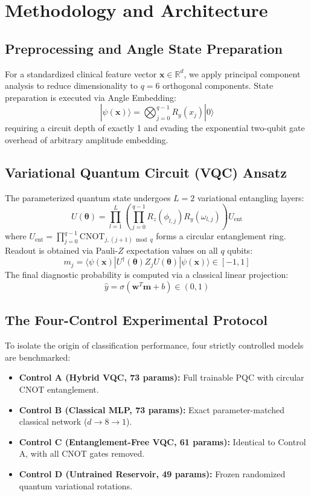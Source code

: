 \documentclass[conference]{IEEEtran}
\begin{document}
\section{Methodology and Architecture}

\subsection{Preprocessing and Angle State Preparation}
For a standardized clinical feature vector $\mathbf{x} \in \mathbb{R}^d$, we apply principal component analysis to reduce dimensionality to $q = 6$ orthogonal components. State preparation is executed via Angle Embedding:
\begin{equation}
|\psi(\mathbf{x})\rangle = \bigotimes_{j=0}^{q-1} R_y(x_j) |0\rangle
\end{equation}
requiring a circuit depth of exactly 1 and evading the exponential two-qubit gate overhead of arbitrary amplitude embedding.

\subsection{Variational Quantum Circuit (VQC) Ansatz}
The parameterized quantum state undergoes $L = 2$ variational entangling layers:
\begin{equation}
U(\boldsymbol{\theta}) = \prod_{l=1}^{L} \left( \prod_{j=0}^{q-1} R_z(\phi_{l,j}) R_y(\omega_{l,j}) \right) U_{\text{ent}}
\end{equation}
where $U_{\text{ent}} = \prod_{j=0}^{q-1} \text{CNOT}_{j, (j+1) \bmod q}$ forms a circular entanglement ring. Readout is obtained via Pauli-$Z$ expectation values on all $q$ qubits:
\begin{equation}
m_j = \langle \psi(\mathbf{x}) | U^\dagger(\boldsymbol{\theta}) Z_j U(\boldsymbol{\theta}) | \psi(\mathbf{x}) \rangle \in [-1, 1]
\end{equation}
The final diagnostic probability is computed via a classical linear projection:
\begin{equation}
\hat{y} = \sigma(\mathbf{w}^T \mathbf{m} + b) \in (0, 1)
\end{equation}

\subsection{The Four-Control Experimental Protocol}
To isolate the origin of classification performance, four strictly controlled models are benchmarked:
\begin{itemize}
    \item \textbf{Control A (Hybrid VQC, 73 params):} Full trainable PQC with circular CNOT entanglement.
    \item \textbf{Control B (Classical MLP, 73 params):} Exact parameter-matched classical network ($d \to 8 \to 1$).
    \item \textbf{Control C (Entanglement-Free VQC, 61 params):} Identical to Control A, with all CNOT gates removed.
    \item \textbf{Control D (Untrained Reservoir, 49 params):} Frozen randomized quantum variational rotations.
\end{itemize}
\end{document}
